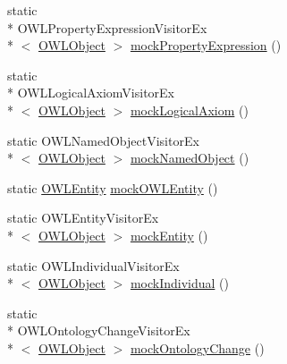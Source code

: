 \begin{DoxyCompactItemize}
\item 
static \\*
O\-W\-L\-Property\-Expression\-Visitor\-Ex\\*
$<$ \hyperlink{interfaceorg_1_1semanticweb_1_1owlapi_1_1model_1_1_o_w_l_object}{O\-W\-L\-Object} $>$ \hyperlink{classorg_1_1semanticweb_1_1owlapi_1_1contract_1_1_utils_a82e96f87669ed8e646c3e88d48d00cac}{mock\-Property\-Expression} ()
\item 
static \\*
O\-W\-L\-Logical\-Axiom\-Visitor\-Ex\\*
$<$ \hyperlink{interfaceorg_1_1semanticweb_1_1owlapi_1_1model_1_1_o_w_l_object}{O\-W\-L\-Object} $>$ \hyperlink{classorg_1_1semanticweb_1_1owlapi_1_1contract_1_1_utils_af71072dadecf5bd41b4ff25e3a6f85df}{mock\-Logical\-Axiom} ()
\item 
static O\-W\-L\-Named\-Object\-Visitor\-Ex\\*
$<$ \hyperlink{interfaceorg_1_1semanticweb_1_1owlapi_1_1model_1_1_o_w_l_object}{O\-W\-L\-Object} $>$ \hyperlink{classorg_1_1semanticweb_1_1owlapi_1_1contract_1_1_utils_abd210886331af80d91543b29e1eb5f73}{mock\-Named\-Object} ()
\item 
static \hyperlink{interfaceorg_1_1semanticweb_1_1owlapi_1_1model_1_1_o_w_l_entity}{O\-W\-L\-Entity} \hyperlink{classorg_1_1semanticweb_1_1owlapi_1_1contract_1_1_utils_ae43cc4778f3a2c8ffdd5cbe1cc456af1}{mock\-O\-W\-L\-Entity} ()
\item 
static O\-W\-L\-Entity\-Visitor\-Ex\\*
$<$ \hyperlink{interfaceorg_1_1semanticweb_1_1owlapi_1_1model_1_1_o_w_l_object}{O\-W\-L\-Object} $>$ \hyperlink{classorg_1_1semanticweb_1_1owlapi_1_1contract_1_1_utils_a3cb2309173d1765827a4cf2a1d661bc8}{mock\-Entity} ()
\item 
static O\-W\-L\-Individual\-Visitor\-Ex\\*
$<$ \hyperlink{interfaceorg_1_1semanticweb_1_1owlapi_1_1model_1_1_o_w_l_object}{O\-W\-L\-Object} $>$ \hyperlink{classorg_1_1semanticweb_1_1owlapi_1_1contract_1_1_utils_a2c0d5ab0ee98f86b9edd329699c0fa80}{mock\-Individual} ()
\item 
static \\*
O\-W\-L\-Ontology\-Change\-Visitor\-Ex\\*
$<$ \hyperlink{interfaceorg_1_1semanticweb_1_1owlapi_1_1model_1_1_o_w_l_object}{O\-W\-L\-Object} $>$ \hyperlink{classorg_1_1semanticweb_1_1owlapi_1_1contract_1_1_utils_a21b991e16ce5fec506e266b67195f4ef}{mock\-Ontology\-Change} ()
\item 

\end{DoxyCompactItemize}
